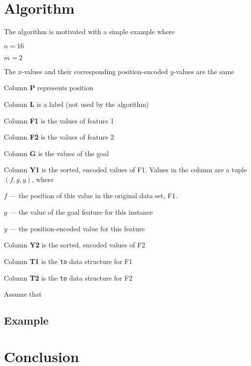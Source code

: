 \documentclass[12pt,letterpaper]{article}
\begin{document}
\section{Algorithm}

The algorithm is motivated with a simple example where
\be
\item \(n= 16\)
\item \(m= 2\)
\item The \(x\)-values and their corresponding position-encoded \(y\)-values are the same
\item Column {\bf P} represents position
\item Column {\bf L} is a label (not used by the algorithm)
\item Column {\bf F1} is the values of feature 1 
\item Column {\bf F2} is the values of feature 2
\item Column {\bf G} is the values of the goal
\item Column {\bf Y1} is the sorted, encoded values of F1. Values in the column
  are a tuple \((f,g,y)\), where 
  \be
\item \(f\) --- the position of this value in the original data set, F1.
\item \(g\) --- the value of the goal feature for this instance
\item \(y\) --- the position-encoded value for this feature
  \ee
\item Column {\bf Y2} is the sorted, encoded values of F2
\item Column {\bf T1} is the {\tt to} data structure for F1
\item Column {\bf T2} is the {\tt to} data structure for F2
  \ee

  Assume that 

\subsection{Example}




\section{Conclusion}



\end{document}
